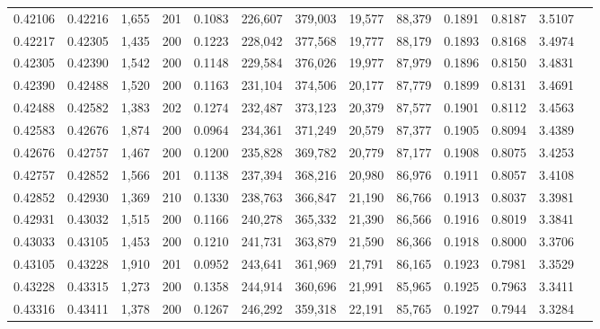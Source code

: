 \begin{tabular}{rrrrrrrrrrrrr}
0.42106 & 0.42216 & 1,655 & 201 &                                     0.1083 & 226,607 & 379,003 &  19,577 &  88,379 & 0.1891 & 0.8187 & 3.5107 \\
0.42217 & 0.42305 & 1,435 & 200 &                                     0.1223 & 228,042 & 377,568 &  19,777 &  88,179 & 0.1893 & 0.8168 & 3.4974 \\
0.42305 & 0.42390 & 1,542 & 200 &                                     0.1148 & 229,584 & 376,026 &  19,977 &  87,979 & 0.1896 & 0.8150 & 3.4831 \\
0.42390 & 0.42488 & 1,520 & 200 &                                     0.1163 & 231,104 & 374,506 &  20,177 &  87,779 & 0.1899 & 0.8131 & 3.4691 \\
0.42488 & 0.42582 & 1,383 & 202 &                                     0.1274 & 232,487 & 373,123 &  20,379 &  87,577 & 0.1901 & 0.8112 & 3.4563 \\
0.42583 & 0.42676 & 1,874 & 200 &                                     0.0964 & 234,361 & 371,249 &  20,579 &  87,377 & 0.1905 & 0.8094 & 3.4389 \\
0.42676 & 0.42757 & 1,467 & 200 &                                     0.1200 & 235,828 & 369,782 &  20,779 &  87,177 & 0.1908 & 0.8075 & 3.4253 \\
0.42757 & 0.42852 & 1,566 & 201 &                                     0.1138 & 237,394 & 368,216 &  20,980 &  86,976 & 0.1911 & 0.8057 & 3.4108 \\
0.42852 & 0.42930 & 1,369 & 210 &                                     0.1330 & 238,763 & 366,847 &  21,190 &  86,766 & 0.1913 & 0.8037 & 3.3981 \\
0.42931 & 0.43032 & 1,515 & 200 &                                     0.1166 & 240,278 & 365,332 &  21,390 &  86,566 & 0.1916 & 0.8019 & 3.3841 \\
0.43033 & 0.43105 & 1,453 & 200 &                                     0.1210 & 241,731 & 363,879 &  21,590 &  86,366 & 0.1918 & 0.8000 & 3.3706 \\
0.43105 & 0.43228 & 1,910 & 201 &                                     0.0952 & 243,641 & 361,969 &  21,791 &  86,165 & 0.1923 & 0.7981 & 3.3529 \\
0.43228 & 0.43315 & 1,273 & 200 &                                     0.1358 & 244,914 & 360,696 &  21,991 &  85,965 & 0.1925 & 0.7963 & 3.3411 \\
0.43316 & 0.43411 & 1,378 & 200 &                                     0.1267 & 246,292 & 359,318 &  22,191 &  85,765 & 0.1927 & 0.7944 & 3.3284 \\

\end{tabular}
